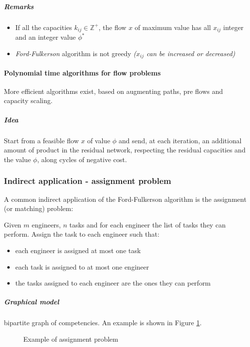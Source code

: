 \documentclass[english]{article}
\begin{document}
\subparagraph*{Remarks}
\begin{itemize}
  \item If all the capacities \(k_{ij} \in \mathbb{Z}^+\), the flow \(x\) of maximum value has all \(x_{ij}\) integer and an integer value \(\phi^\ast\)
  \item \textit{Ford-Fulkerson} algorithm is not greedy \textit{(\(x_{ij}\) can be increased or decreased)}
\end{itemize}

\paragraph{Polynomial time algorithms for flow problems}

More efficient algorithms exist, based on augmenting paths, pre flows and capacity scaling.

\subparagraph*{Idea}
Start from a feasible flow \(x\) of value \(\phi\) and send, at each iteration, an additional amount of product in the residual network, respecting the residual capacities and the value \(\phi\), along cycles of negative cost.

\subsubsection{Indirect application - assignment problem}

A common indirect application of the Ford-Fulkerson algorithm is the assignment (or matching) problem:

Given \(m\) engineers, \(n\) tasks and for each engineer the list of tasks they can perform.
Assign the task to each engineer such that:

\begin{itemize}
  \item each engineer is assigned at most one task
  \item each task is assigned to at most one engineer
  \item the tasks assigned to each engineer are the ones they can perform
\end{itemize}

\subparagraph*{Graphical model}
bipartite graph of competencies.
An example is shown in Figure \ref{fig:assignment-example}.

\begin{figure}[htbp]
  \bigskip
  \centering
  \caption{Example of assignment problem}
  \label{fig:assignment-example}
  \bigskip
\end{figure}
\end{document}
